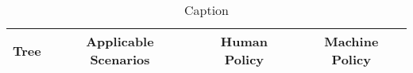 \begin{table}[]
\centering
\begin{tabular}{c c c c}
\toprule
Tree & Applicable Scenarios & Human Policy & Machine Policy \\ 
\toprule
\bottomrule\end{tabular}
\caption{Caption}
\label{tab:my_label}
\end{table}



